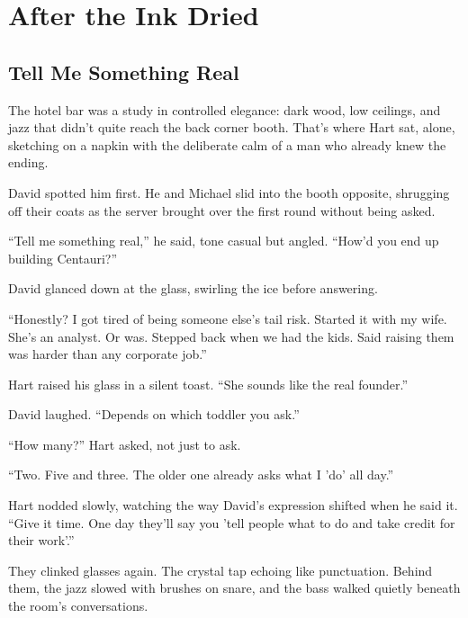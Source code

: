 
\section{After the Ink Dried}

\subsection{Tell Me Something Real}

The hotel bar was a study in controlled elegance: dark wood, low ceilings, and jazz that didn’t 
quite reach the back corner booth.
That’s where Hart sat, alone, sketching on a napkin with the deliberate calm of a man who already knew 
the ending.

David spotted him first.
He and Michael slid into the booth opposite, shrugging off their coats as the server brought over the 
first round without being asked.

``Tell me something real,'' he said, tone casual but angled. ``How’d you end up building Centauri?''

David glanced down at the glass, swirling the ice before answering.

``Honestly? I got tired of being someone else’s tail risk. Started it with my wife. She’s an analyst. 
Or was. Stepped back when we had the kids. Said raising them was harder than any corporate job.''

Hart raised his glass in a silent toast. ``She sounds like the real founder.''

David laughed. ``Depends on which toddler you ask.''

``How many?'' Hart asked, not just to ask.

``Two. Five and three. The older one already asks what I 'do' all day.''

Hart nodded slowly, watching the way David’s expression shifted when he said it.
``Give it time. One day they’ll say you 'tell people what to do and take credit for their work'.''

They clinked glasses again. The crystal tap echoing like punctuation. Behind them, the jazz slowed with 
brushes on snare, and the bass walked quietly beneath the room’s conversations.

\medskip

